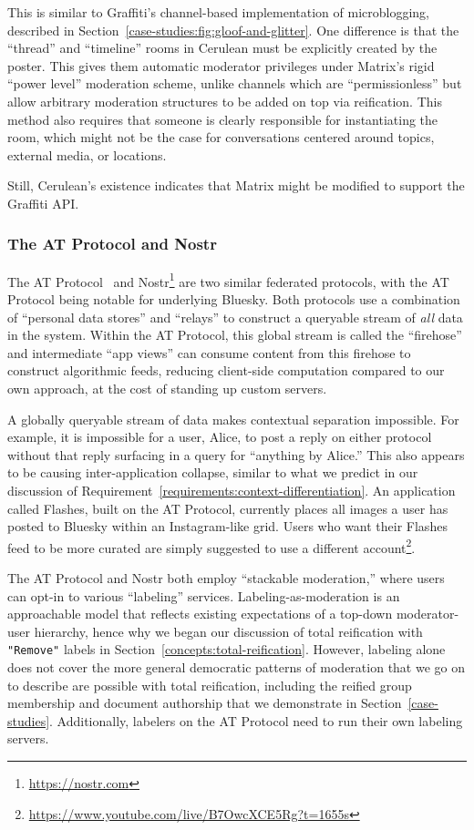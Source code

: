 This is similar to Graffiti's channel-based implementation of microblogging, described
in Section~\ref{case-studies:fig:gloof-and-glitter}.
One difference is that the ``thread'' and ``timeline'' rooms
in Cerulean
must be explicitly created by the poster.
This gives them automatic moderator privileges
under Matrix's rigid ``power level'' moderation
scheme, unlike channels
which are ``permissionless'' but allow arbitrary
moderation structures to be added on top via
reification.
This method also requires that someone is clearly responsible for instantiating the room,
which might not be the case for conversations centered around topics, external media, or locations.

Still, Cerulean's existence indicates that
Matrix might be modified to support the Graffiti API.

\subsubsection{The AT Protocol and Nostr}

The AT Protocol~\cite{bluesky} and Nostr\footnote{
\url{https://nostr.com}
} are two similar federated protocols,
with the AT Protocol being notable for underlying Bluesky.
Both protocols use a combination of ``personal data stores'' and ``relays''
to construct a queryable stream of \emph{all} data in the system.
Within the AT Protocol, this global stream is called the ``firehose''
and intermediate ``app views'' can consume content from this firehose to
construct algorithmic feeds, reducing client-side computation compared
to our own approach, at the cost of standing up custom servers.

A globally queryable stream of data makes contextual separation impossible.
For example, it is impossible for a user, Alice, to post a reply on either protocol
without that reply surfacing in a query for ``anything by Alice.''
This also appears to be causing inter-application collapse, similar to
what we predict in our discussion of Requirement~\ref{requirements:context-differentiation}.
An application called Flashes, built on the AT Protocol,
currently places all images a user has posted to Bluesky within
an Instagram-like grid. Users who want their Flashes feed to be
more curated are simply suggested to use a different account\footnote{
    \url{https://www.youtube.com/live/B7OwcXCE5Rg?t=1655s}
}.

The AT Protocol and Nostr both employ ``stackable
moderation,'' where users can opt-in to various ``labeling'' services.
Labeling-as-moderation is an approachable model that reflects existing expectations of a
top-down moderator-user hierarchy,
hence why we began our discussion of total reification
with \texttt{"Remove"} labels in Section~\ref{concepts:total-reification}.
However, labeling alone does not cover the more general democratic patterns
of moderation that we go on to describe are possible with total reification,
including the reified group membership and document authorship
that we demonstrate in Section~\ref{case-studies}.
Additionally, labelers on the AT Protocol need to run their own labeling servers.

